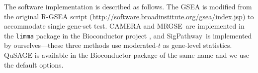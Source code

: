 \documentclass[a4,center,fleqn]{NAR}
\newcommand{\HowmanyTest}{six}
\newcommand{\CMR}{CAMERA-rank}
\newcommand{\CMT}{CAMERA-modt}
\newcommand{\gent}{SigPathway}
\newcommand{\genr}{MRGSE}
\begin{document}
	
	The software implementation is described as follows. The GSEA is modified from the original 
	R-GSEA script (\url{http://software.broadinstitute.org/gsea/index.jsp}) to accommodate single 
	gene-set test. CAMERA and \genr~are implemented in the \verb|limma| package 
	\citep{smyth2005limma} in the Bioconductor project \citep{gentleman2004bioconductor}, and 
	\gent~is implemented by ourselves---these three methods use moderated-$t$ as gene-level 
	statistics. QuSAGE is 
	available in the Bioconductor package of the same name and we use the default options. 
	
	
	
	
	
\end{document}
